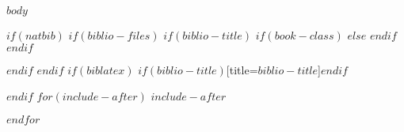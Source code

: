 \documentclass[$if(fontsize)$$fontsize$,$endif$$if(lang)$$lang$,$endif$$if(papersize)$$papersize$,$endif$$for(classoption)$$classoption$$sep$,$endfor$]{$documentclass$}
\begin{document}
\setcounter{page}{1}
\pagestyle{fancy}

$body$

$if(natbib)$
$if(biblio-files)$
$if(biblio-title)$
$if(book-class)$
\renewcommand\bibname{$biblio-title$}
$else$
\renewcommand\refname{$biblio-title$}
$endif$
$endif$


$endif$
$endif$
$if(biblatex)$
\printbibliography$if(biblio-title)$[title=$biblio-title$]$endif$

$endif$
$for(include-after)$
$include-after$

$endfor$
\end{document}
